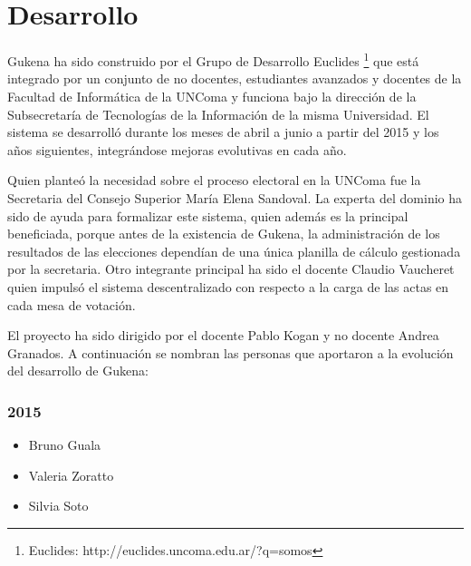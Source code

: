 \section{Desarrollo}

Gukena ha sido construido por el Grupo de Desarrollo Euclides \footnote{Euclides: http://euclides.uncoma.edu.ar/?q=somos} que está integrado por un conjunto de no docentes, estudiantes avanzados y docentes de la Facultad de Informática de la UNComa y funciona bajo la dirección de la Subsecretaría de Tecnologías de la Información de la misma Universidad. El sistema se desarrolló durante los meses de abril a junio a partir del 2015 y los años siguientes, integrándose mejoras evolutivas en cada año.

Quien planteó la necesidad sobre el proceso electoral en la UNComa fue la Secretaria del Consejo Superior María Elena Sandoval. La experta del dominio ha sido de ayuda para formalizar este sistema, quien además es la principal beneficiada, porque antes de la existencia de Gukena, la administración de los resultados de las elecciones dependían de una única planilla de cálculo gestionada por la secretaria. Otro integrante principal ha sido el docente Claudio Vaucheret quien impulsó el sistema descentralizado con respecto a la carga de las actas en cada mesa de votación.

El proyecto ha sido dirigido por el docente Pablo Kogan y no docente Andrea Granados. \newline
A continuación se nombran las personas que aportaron a la evolución del desarrollo de Gukena:
\subsubsection{2015}
\begin{itemize}
    \item Bruno Guala
    \item Valeria Zoratto
    \item Silvia Soto
\end{itemize}
